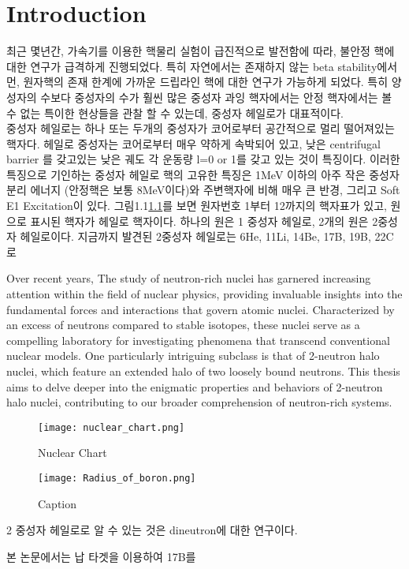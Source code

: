\chapter{Introduction}
최근 몇년간, 가속기를 이용한 핵물리 실험이 급진적으로 발전함에 따라, 불안정 핵에 대한 연구가 급격하게 진행되었다. 특히 자연에서는 존재하지 않는 beta stability에서 먼, 원자핵의 존재 한계에 가까운 드립라인 핵에 대한 연구가 가능하게 되었다. 특히 양성자의 수보다 중성자의 수가 훨씬 많은 중성자 과잉 핵자에서는 안정 핵자에서는 볼 수 없는 특이한 현상들을 관찰 할 수 있는데, 중성자 헤일로가 대표적이다. \\
\indent 중성자 헤일로는 하나 또는 두개의 중성자가 코어로부터 공간적으로 멀리 떨어져있는 핵자다. 헤일로 중성자는 코어로부터 매우 약하게 속박되어 있고, 낮은 centrifugal barrier 를 갖고있는 낮은 궤도 각 운동량 l=0 or 1를 갖고 있는 것이 특징이다. 이러한 특징으로 기인하는 중성자 헤일로 핵의 고유한 특징은 1MeV 이하의 아주 작은 중성자 분리 에너지 (안정핵은 보통 8MeV이다)와 주변핵자에 비해 매우 큰 반경, 그리고 Soft E1 Excitation이 있다.
그림1.1\ref{Nuclear chart}를 보면 원자번호 1부터 12까지의 핵자표가 있고, 원으로 표시된 핵자가 헤일로 핵자이다. 하나의 원은 1 중성자 헤일로, 2개의 원은 2중성자 헤일로이다. 지금까지 발견된 2중성자 헤일로는 6He, 11Li, 14Be, 17B, 19B, 22C로 

Over recent years, The study of neutron-rich nuclei has garnered increasing attention within the field of nuclear physics, providing invaluable insights into the fundamental forces and interactions that govern atomic nuclei. Characterized by an excess of neutrons compared to stable isotopes, these nuclei serve as a compelling laboratory for investigating phenomena that transcend conventional nuclear models. One particularly intriguing subclass is that of 2-neutron halo nuclei, which feature an extended halo of two loosely bound neutrons.\cite{tanihata} This thesis aims to delve deeper into the enigmatic properties and behaviors of 2-neutron halo nuclei, contributing to our broader comprehension of neutron-rich systems.

\begin{figure}[h]
    \centering
    \texttt{[image: nuclear\_chart.png]}
    \caption{Nuclear Chart}
    \label{Nuclear chart}
\end{figure}

\begin{figure}
    \centering
    \texttt{[image: Radius\_of\_boron.png]}
    \caption{Caption}
    \label{fig:enter-label}
\end{figure}
2 중성자 헤일로로 알 수 있는 것은 dineutron에 대한 연구이다. 

본 논문에서는 납 타겟을 이용하여 17B를 



